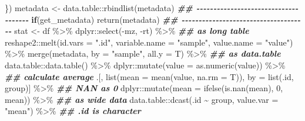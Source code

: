 \documentclass[
]{article}
\newenvironment{Shaded}{\begin{snugshade}}{\end{snugshade}}
\newcommand{\AttributeTok}[1]{\textcolor[rgb]{0.77,0.63,0.00}{#1}}
\newcommand{\ControlFlowTok}[1]{\textcolor[rgb]{0.13,0.29,0.53}{\textbf{#1}}}
\newcommand{\DecValTok}[1]{\textcolor[rgb]{0.00,0.00,0.81}{#1}}
\newcommand{\DocumentationTok}[1]{\textcolor[rgb]{0.56,0.35,0.01}{\textbf{\textit{#1}}}}
\newcommand{\FunctionTok}[1]{\textcolor[rgb]{0.00,0.00,0.00}{#1}}
\newcommand{\NormalTok}[1]{#1}
\newcommand{\OtherTok}[1]{\textcolor[rgb]{0.56,0.35,0.01}{#1}}
\newcommand{\SpecialCharTok}[1]{\textcolor[rgb]{0.00,0.00,0.00}{#1}}
\newcommand{\StringTok}[1]{\textcolor[rgb]{0.31,0.60,0.02}{#1}}
\begin{document}
\begin{Shaded}
\begin{Highlighting}[]
\NormalTok{                       \})}
\NormalTok{    metadata }\OtherTok{\textless{}{-}}\NormalTok{ data.table}\SpecialCharTok{::}\FunctionTok{rbindlist}\NormalTok{(metadata)}
    \DocumentationTok{\#\# {-}{-}{-}{-}{-}{-}{-}{-}{-}{-}{-}{-}{-}{-}{-}{-}{-}{-}{-}{-}{-}{-}{-}{-}{-}{-}{-}{-}{-}{-}{-}{-}{-}{-}{-}{-}{-} }
    \ControlFlowTok{if}\NormalTok{(get\_metadata)}
      \FunctionTok{return}\NormalTok{(metadata)}
    \DocumentationTok{\#\# {-}{-}{-}{-}{-}{-}{-}{-}{-}{-}{-}{-}{-}{-}{-}{-}{-}{-}{-}{-}{-}{-}{-}{-}{-}{-}{-}{-}{-}{-}{-}{-}{-}{-}{-}{-}{-} }
\NormalTok{    stat }\OtherTok{\textless{}{-}}\NormalTok{ df }\SpecialCharTok{\%\textgreater{}\%}
\NormalTok{      dplyr}\SpecialCharTok{::}\FunctionTok{select}\NormalTok{(}\SpecialCharTok{{-}}\NormalTok{mz, }\SpecialCharTok{{-}}\NormalTok{rt) }\SpecialCharTok{\%\textgreater{}\%} 
      \DocumentationTok{\#\# as long table}
\NormalTok{      reshape2}\SpecialCharTok{::}\FunctionTok{melt}\NormalTok{(}\AttributeTok{id.vars =} \StringTok{".id"}\NormalTok{, }\AttributeTok{variable.name =} \StringTok{"sample"}\NormalTok{, }\AttributeTok{value.name =} \StringTok{"value"}\NormalTok{) }\SpecialCharTok{\%\textgreater{}\%}
      \FunctionTok{merge}\NormalTok{(metadata, }\AttributeTok{by =} \StringTok{"sample"}\NormalTok{, }\AttributeTok{all.y =}\NormalTok{ T) }\SpecialCharTok{\%\textgreater{}\%} 
      \DocumentationTok{\#\# as data.table}
\NormalTok{      data.table}\SpecialCharTok{::}\FunctionTok{data.table}\NormalTok{() }\SpecialCharTok{\%\textgreater{}\%} 
\NormalTok{      dplyr}\SpecialCharTok{::}\FunctionTok{mutate}\NormalTok{(}\AttributeTok{value =} \FunctionTok{as.numeric}\NormalTok{(value)) }\SpecialCharTok{\%\textgreater{}\%} 
      \DocumentationTok{\#\# calculate average}
\NormalTok{      .[, }\FunctionTok{list}\NormalTok{(}\AttributeTok{mean =} \FunctionTok{mean}\NormalTok{(value, }\AttributeTok{na.rm =}\NormalTok{ T)), by }\OtherTok{=} \FunctionTok{list}\NormalTok{(.id, group)] }\SpecialCharTok{\%\textgreater{}\%}
      \DocumentationTok{\#\# NAN as 0}
\NormalTok{      dplyr}\SpecialCharTok{::}\FunctionTok{mutate}\NormalTok{(}\AttributeTok{mean =} \FunctionTok{ifelse}\NormalTok{(}\FunctionTok{is.nan}\NormalTok{(mean), }\DecValTok{0}\NormalTok{, mean)) }\SpecialCharTok{\%\textgreater{}\%}
      \DocumentationTok{\#\# as wide data}
\NormalTok{      data.table}\SpecialCharTok{::}\FunctionTok{dcast}\NormalTok{(.id }\SpecialCharTok{\textasciitilde{}}\NormalTok{ group, }\AttributeTok{value.var =} \StringTok{"mean"}\NormalTok{) }\SpecialCharTok{\%\textgreater{}\%}
      \DocumentationTok{\#\# .id is character}

\end{Highlighting}
\end{Shaded}
\end{document}
